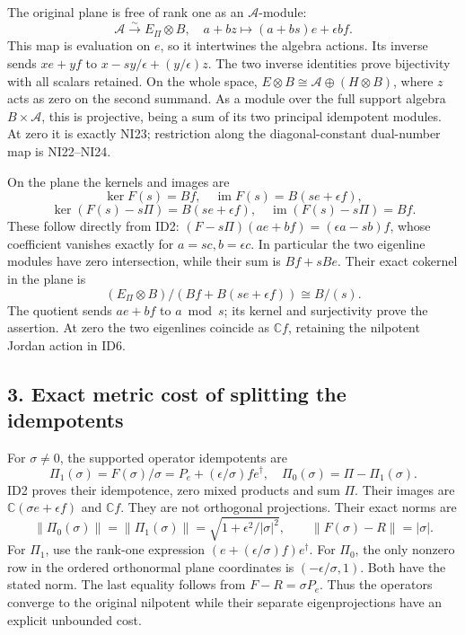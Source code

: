 \documentclass[
]{article}
\begin{document}
The original plane is free of rank one as an \(\mathcal A\)-module: \[
\mathcal A\xrightarrow{\sim}E_\Pi\otimes B,
\quad a+bz\longmapsto(a+bs)e+\epsilon bf.
\tag{ID8}
\] This map is evaluation on \(e\), so it intertwines the algebra
actions. Its inverse sends \(xe+yf\) to \(x-sy/\epsilon+(y/\epsilon)z\).
The two inverse identities prove bijectivity with all scalars retained.
On the whole space, \(E\otimes B\cong\mathcal A\oplus(H\otimes B)\),
where \(z\) acts as zero on the second summand. As a module over the
full support algebra \(B\times\mathcal A\), this is projective, being a
sum of its two principal idempotent modules. At zero it is exactly NI23;
restriction along the diagonal-constant dual-number map is NI22--NI24.

On the plane the kernels and images are \[
\ker F(s)=Bf,\quad \operatorname{im}F(s)=B(se+\epsilon f),
\] \[
\ker(F(s)-s\Pi)=B(se+\epsilon f),
\quad\operatorname{im}(F(s)-s\Pi)=Bf.
\tag{ID9}
\] These follow directly from ID2: \((F-s\Pi)(ae+bf)=(\epsilon a-sb)f\),
whose coefficient vanishes exactly for \(a=sc,b=\epsilon c\). In
particular the two eigenline modules have zero intersection, while their
sum is \(Bf+sBe\). Their exact cokernel in the plane is \[
(E_\Pi\otimes B)/(Bf+B(se+\epsilon f))\cong B/(s).
\tag{ID10}
\] The quotient sends \(ae+bf\) to \(a\bmod s\); its kernel and
surjectivity prove the assertion. At zero the two eigenlines coincide as
\(\mathbb Cf\), retaining the nilpotent Jordan action in ID6.

\subsection{3. Exact metric cost of splitting the
idempotents}\label{exact-metric-cost-of-splitting-the-idempotents}

For \(\sigma\ne0\), the supported operator idempotents are \[
\Pi_1(\sigma)=F(\sigma)/\sigma
=P_e+(\epsilon/\sigma)fe^\dagger,
\quad\Pi_0(\sigma)=\Pi-\Pi_1(\sigma).
\tag{ID11}
\] ID2 proves their idempotence, zero mixed products and sum \(\Pi\).
Their images are \(\mathbb C(\sigma e+\epsilon f)\) and \(\mathbb Cf\).
They are not orthogonal projections. Their exact norms are \[
\|\Pi_0(\sigma)\|=\|\Pi_1(\sigma)\|
=\sqrt{1+\epsilon^2/|\sigma|^2},
\qquad \|F(\sigma)-R\|=|\sigma|.
\tag{ID12}
\] For \(\Pi_1\), use the rank-one expression
\((e+(\epsilon/\sigma)f)e^\dagger\). For \(\Pi_0\), the only nonzero row
in the ordered orthonormal plane coordinates is
\((-\epsilon/\sigma,1)\). Both have the stated norm. The last equality
follows from \(F-R=\sigma P_e\). Thus the operators converge to the
original nilpotent while their separate eigenprojections have an
explicit unbounded cost.
\end{document}
